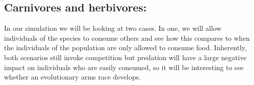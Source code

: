 \nid \subsection{Carnivores and herbivores:}
\bigbreak
In our simulation we will be looking at two cases. In one, we will allow 
individuals of the species to consume others and see how this
compares to when the individuals of the population are only allowed to 
consume food. Inherently, both scenarios still invoke competition but
predation will have a large negative impact on individuals who are easily
consumed, so it will be interesting to see whether an evolutionary arms 
race develops.